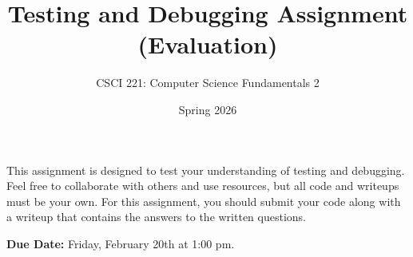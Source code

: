 \documentclass{exam}
\begin{document}
\title{Testing and Debugging Assignment (Evaluation)}
\author{CSCI 221: Computer Science Fundamentals 2}
\date{Spring 2026}
\maketitle


This assignment is designed to test your understanding of testing and debugging. 
Feel free to collaborate with others and use resources, but all code and writeups must be your own. 
For this assignment, you should submit your code along with a writeup that contains the answers to the written questions. 

\textbf{Due Date:}
Friday, February 20th at 1:00 pm. 
\end{document}
